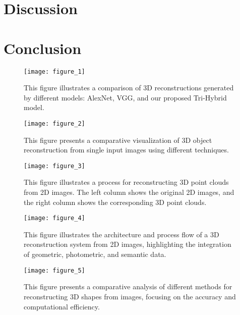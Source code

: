 \documentclass[10pt,journal,compsoc]{IEEEtran}
\begin{document}
\section{Discussion}


\section{Conclusion}


\begin{figure}[htbp]
    \centering
    \texttt{[image: figure\_1]}
    \caption{This figure illustrates a comparison of 3D reconstructions generated by different models: AlexNet, VGG, and our proposed Tri-Hybrid model.}
    \label{fig:figure_1}
\end{figure}

\begin{figure}[htbp]
    \centering
    \texttt{[image: figure\_2]}
    \caption{This figure presents a comparative visualization of 3D object reconstruction from single input images using different techniques.}
    \label{fig:figure_2}
\end{figure}

\begin{figure}[htbp]
    \centering
    \texttt{[image: figure\_3]}
    \caption{This figure illustrates a process for reconstructing 3D point clouds from 2D images. The left column shows the original 2D images, and the right column shows the corresponding 3D point clouds.}
    \label{fig:figure_3}
\end{figure}

\begin{figure}[htbp]
    \centering
    \texttt{[image: figure\_4]}
    \caption{This figure illustrates the architecture and process flow of a 3D reconstruction system from 2D images, highlighting the integration of geometric, photometric, and semantic data.}
    \label{fig:figure_4}
\end{figure}

\begin{figure}[htbp]
    \centering
    \texttt{[image: figure\_5]}
    \caption{This figure presents a comparative analysis of different methods for reconstructing 3D shapes from images, focusing on the accuracy and computational efficiency.}
    \label{fig:figure_5}
\end{figure}
\end{document}
